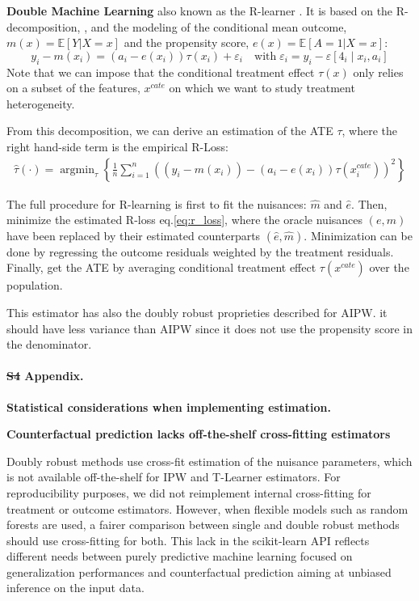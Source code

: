 \documentclass[10pt,letterpaper]{article}
\providecommand{\DIFaddtex}[1]{{\protect\color{blue}\uwave{#1}}} %
\providecommand{\DIFdeltex}[1]{{\protect\color{red}\sout{#1}}}                      %
\providecommand{\DIFaddbegin}{} %
\providecommand{\DIFaddend}{} %
\providecommand{\DIFdelbegin}{} %
\providecommand{\DIFdelend}{} %
\providecommand{\DIFadd}[1]{\texorpdfstring{\DIFaddtex{#1}}{#1}} %
\providecommand{\DIFdel}[1]{\texorpdfstring{\DIFdeltex{#1}}{}} %
\newcommand{\DIFscaledelfig}{0.5}
\newlength{\DIFdelgraphicswidth} %
\newlength{\DIFdelgraphicsheight} %
\newcommand{\DIFaddincludegraphics}[2][]{{\color{blue}\fbox{\DIFOincludegraphics[#1]{#2}}}} %
\newcommand{\DIFdelincludegraphics}[2][]{%
\sbox{\DIFdelgraphicsbox}{\DIFOincludegraphics[#1]{#2}}%
\settoboxwidth{\DIFdelgraphicswidth}{\DIFdelgraphicsbox} %
\settoboxtotalheight{\DIFdelgraphicsheight}{\DIFdelgraphicsbox} %
\scalebox{\DIFscaledelfig}{%
\parbox[b]{\DIFdelgraphicswidth}{\usebox{\DIFdelgraphicsbox}\\[-\baselineskip] \rule{\DIFdelgraphicswidth}{0em}}\llap{\resizebox{\DIFdelgraphicswidth}{\DIFdelgraphicsheight}{%
\setlength{\unitlength}{\DIFdelgraphicswidth}%
\begin{picture}(1,1)%
\thicklines\linethickness{2pt} %
{\color[rgb]{1,0,0}\put(0,0){\framebox(1,1){}}}%
{\color[rgb]{1,0,0}\put(0,0){\line( 1,1){1}}}%
{\color[rgb]{1,0,0}\put(0,1){\line(1,-1){1}}}%
\end{picture}%
}\hspace*{3pt}}} %
} %
\DeclareRobustCommand{\DIFaddbegin}{\DIFOaddbegin \let\includegraphics\DIFaddincludegraphics} %
\DeclareRobustCommand{\DIFaddend}{\DIFOaddend \let\includegraphics\DIFOincludegraphics} %
\DeclareRobustCommand{\DIFdelbegin}{\DIFOdelbegin \let\includegraphics\DIFdelincludegraphics} %
\DeclareRobustCommand{\DIFdelend}{\DIFOaddend \let\includegraphics\DIFOincludegraphics} %
\begin{document}
\textbf{Double Machine Learning} \cite{chernozhukov2018double} also known
as the R-learner \cite{nie2021quasi}. It is based on the R-decomposition,
\cite{robinson1988root}, and the modeling of the conditional mean outcome,
$m(x)=\mathbb E[Y|X=x]$ and the propensity score, $e(x)=\mathbb E[A=1|X=x]$:
\begin{equation}\label{eq:r_decomposition}
  y_{i}-m\left(x_{i}\right)=\left(a_{i}-e\left(x_{i}\right)\right) \tau\left(x_{i}\right)+\varepsilon_{i} \quad \text{with} \; \varepsilon_{i}=y_{i}-\varepsilon\left[4_{i} \mid x_{i}, a_{i}\right]
\end{equation}
Note that we can impose that the conditional treatment effect $\tau(x)$ only
relies on a subset of the features, $x^{cate}$ on which we want to study
treatment heterogeneity.

From this decomposition, we can derive an estimation of the ATE $\tau$, where
the right hand-side term is the empirical R-Loss:
\begin{align}\label{eq:r_loss}
  \hat{\tau}(\cdot)=\operatorname{argmin}_{\tau}\left\{\frac{1}{n} \sum_{i=1}^{n}\left(\left(y_{i}-m\left(x_{i}\right)\right)-\left(a_{i}-e(x_{i})\right) \tau\left(x^{cate}_{i}\right)\right)^{2}\right\}
\end{align}

The full procedure for R-learning is first to fit the nuisances: $\hat m$ and
$\hat e$. Then, minimize the estimated R-loss eq.\ref{eq:r_loss}, where
the oracle nuisances $(e, m)$ have been replaced by their estimated
counterparts $(\hat e, \hat m)$. Minimization can be done by regressing
the outcome residuals weighted by the treatment residuals. Finally, get
the ATE by averaging conditional treatment effect $\tau(x^{cate})$ over
the population.

This estimator has also the doubly robust proprieties described for AIPW. it
should have less variance than AIPW since it does not use the propensity score
in the denominator.
\clearpage


\paragraph*{\DIFdelbegin \DIFdel{S4 }\DIFdelend \DIFaddbegin \DIFadd{S3 }\DIFaddend Appendix.}
\label{apd:statistical_considerations}
{\bf Statistical considerations when implementing
  estimation.}

\textbf{Counterfactual prediction lacks off-the-shelf cross-fitting estimators}

Doubly robust methods use cross-fit estimation of the nuisance parameters,
which is not available off-the-shelf for IPW and T-Learner estimators. For
reproducibility purposes, we did not reimplement internal cross-fitting for
treatment or outcome estimators. However, when flexible models such as
random forests are used, a fairer comparison between single and double
robust methods should use cross-fitting for both. This lack in the
scikit-learn API \cite{pedregosa2011scikit} reflects different needs
between purely predictive machine learning focused on generalization
performances and counterfactual prediction aiming at unbiased inference on
the input data.
\end{document}
